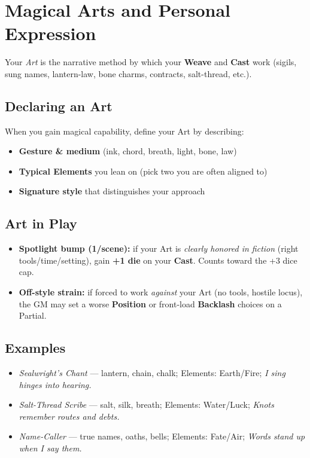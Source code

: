 \section{Magical Arts and Personal Expression}
\label{sec:magical-arts}

Your \emph{Art} is the narrative method by which your \textbf{Weave} and \textbf{Cast} work (sigils, sung names, lantern-law, bone charms, contracts, salt-thread, etc.).

\subsection{Declaring an Art}
\label{subsec:declaring-art}
When you gain magical capability, define your Art by describing:
\begin{itemize}
  \item \textbf{Gesture \& medium} (ink, chord, breath, light, bone, law)
  \item \textbf{Typical Elements} you lean on (pick two you are often aligned to)
  \item \textbf{Signature style} that distinguishes your approach
\end{itemize}

\subsection{Art in Play}
\label{subsec:art-in-play}
\begin{itemize}
  \item \textbf{Spotlight bump (1/scene):} if your Art is \emph{clearly honored in fiction} (right tools/time/setting), gain \textbf{+1 die} on your \textbf{Cast}. Counts toward the +3 dice cap. 
  \item \textbf{Off-style strain:} if forced to work \emph{against} your Art (no tools, hostile locus), the GM may set a worse \textbf{Position} or front-load \textbf{Backlash} choices on a Partial. 
\end{itemize}

\subsection{Examples}
\label{subsec:art-examples}
\begin{itemize}
  \item \emph{Sealwright's Chant} — lantern, chain, chalk; Elements: Earth/Fire; \textit{I sing hinges into hearing.}
  \item \emph{Salt-Thread Scribe} — salt, silk, breath; Elements: Water/Luck; \textit{Knots remember routes and debts.}
  \item \emph{Name-Caller} — true names, oaths, bells; Elements: Fate/Air; \textit{Words stand up when I say them.}
\end{itemize}

